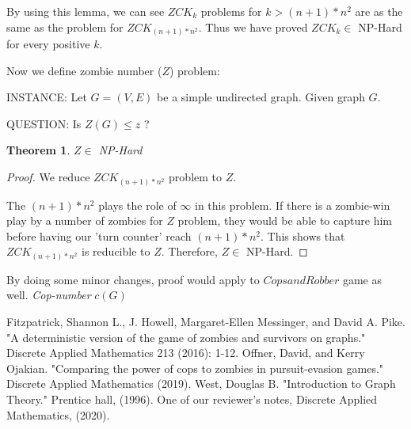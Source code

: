 \documentclass[1p]{elsarticle}
\newtheorem{theorem}{Theorem}
\begin{document}
	By using this lemma, we can see $ZCK_k$ problems for $k > (n + 1) * n^2$ are as the same as the problem for $ZCK_{(n
	+ 1) * n^2}$. Thus we have proved $ZCK_k \in$ NP-Hard for every positive $k$.

	Now we define zombie number ($Z$) problem:

	INSTANCE: Let $G = (V,E)$ be a simple undirected graph. Given graph $G$.

	QUESTION: Is $Z(G) \leq z$ ?

	\begin{theorem}
		$Z \in$ NP-Hard
	\end{theorem}
	\begin{proof}
		We reduce $ZCK_{(n + 1) * n ^ 2}$ problem to $Z$.

		The $(n + 1) * n ^ 2$ plays the role of $\infty$ in this problem. If there is a zombie-win play by a number of
		zombies for $Z$ problem, they would be able to capture him before having our 'turn counter' reach $(n + 1) * n
		^ 2$. This shows that $ZCK_{(n + 1) * n ^ 2}$ is reducible to
		$Z$. Therefore, $Z \in$ NP-Hard.
	\end{proof}

	By doing some minor changes, proof would apply to $Cops and Robber$ game as well.  {\it
	Cop-number} $c(G)$ 

\begin{thebibliography}{999}
	
	Fitzpatrick, Shannon L., J. Howell, Margaret-Ellen Messinger, and David A. Pike. "A deterministic version of the
	game of zombies and survivors on graphs." Discrete Applied Mathematics 213 (2016): 1-12.
	Offner, David, and Kerry Ojakian. "Comparing the power of cops to zombies in pursuit-evasion games." Discrete
	Applied Mathematics (2019).
	West, Douglas B. "Introduction to Graph Theory." Prentice hall, (1996).
	One of our reviewer's notes, Discrete Applied Mathematics, (2020).
\end{thebibliography}
	
\end{document}
